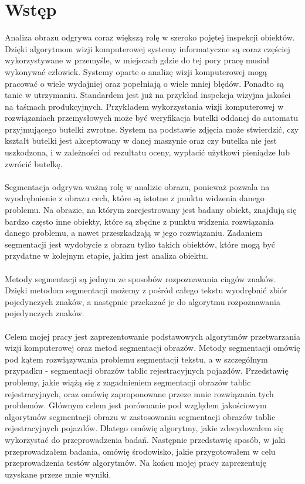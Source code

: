 \section{Wstęp}
Analiza obrazu odgrywa coraz większą rolę w szeroko pojętej inspekcji obiektów. Dzięki algorytmom wizji komputerowej systemy informatyczne są coraz częściej wykorzystywane w przemyśle, w miejscach gdzie do tej pory pracę musiał wykonywać człowiek. Systemy oparte o analizę wizji komputerowej mogą pracować o wiele wydajniej oraz popełniają o wiele mniej błędów. Ponadto są tanie w utrzymaniu. Standardem jest już na przykład inspekcja wizyjna jakości na taśmach produkcyjnych. Przykładem wykorzystania wizji komputerowej w rozwiązaniach przemysłowych może być weryfikacja butelki oddanej do automatu przyjmującego butelki zwrotne. System na podstawie zdjęcia może stwierdzić, czy kształt butelki jest akceptowany w danej maszynie oraz czy butelka nie jest uszkodzona, i w zależności od rezultatu oceny, wypłacić użytkowi pieniądze lub zwrócić butelkę.
\paragraph{}
Segmentacja odgrywa ważną rolę w analizie obrazu, ponieważ pozwala na wyodrębnienie z obrazu cech, które są istotne z punktu widzenia danego problemu. Na obrazie, na którym zarejestrowany jest badany obiekt, znajdują się bardzo często inne obiekty, które są zbędne z punktu widzenia rozwiązania danego problemu, a nawet przeszkadzają w jego rozwiązaniu. Zadaniem segmentacji jest wydobycie z obrazu tylko takich obiektów, które mogą być przydatne w kolejnym etapie, jakim jest analiza obiektu.
\paragraph{}
Metody segmentacji są jednym ze sposobów rozpoznawania ciągów znaków. Dzięki metodom segmentacji możemy z pośród całego tekstu wyodrębnić zbiór pojedynczych znaków, a następnie przekazać je do algorytmu rozpoznawania pojedynczych znaków.
\paragraph{}
Celem mojej pracy jest zaprezentowanie podstawowych algorytmów przetwarzania wizji komputerowej oraz metod segmentacji obrazów. Metody segmentacji omówię pod kątem rozwiązywania problemu segmentacji tekstu, a w szczególnym przypadku - segmentacji obrazów tablic rejestracyjnych pojazdów. Przedstawię problemy, jakie wiążą się z zagadnieniem segmentacji obrazów tablic rejestracyjnych, oraz omówię zaproponowane przeze mnie rozwiązania tych problemów. Głównym celem jest porównanie pod względem jakościowym algorytmów segmentacji obrazu w zastosowaniu segmentacji obrazów tablic rejestracyjnych pojazdów. Dlatego omówię algorytmy, jakie zdecydowałem się wykorzystać do przeprowadzenia badań. Następnie przedstawię sposób, w jaki przeprowadzałem badania, omówię środowisko, jakie przygotowałem w celu przeprowadzenia testów algorytmów. Na końcu mojej pracy zaprezentuję uzyskane przeze mnie wyniki.
